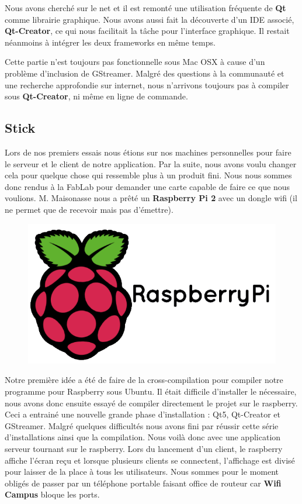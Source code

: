 \documentclass[a4paper, 11pt]{article}
\begin{document}
Nous avons cherché sur le net et il est remonté une utilisation fréquente de \textbf{Qt} comme librairie graphique. Nous avons aussi fait la découverte d'un IDE associé, \textbf{Qt-Creator}, ce qui nous facilitait la tâche pour l'interface graphique. Il restait néanmoins à intégrer les deux frameworks en même temps.

Cette partie n'est toujours pas fonctionnelle sous Mac OSX à cause d'un problème d'inclusion de GStreamer. Malgré des questions à la communauté et une recherche approfondie sur internet, nous n'arrivons toujours pas à compiler sous \textbf{Qt-Creator}, ni même en ligne de commande.

\subsection{Stick}

Lors de nos premiers essais nous étions sur nos machines personnelles pour faire le serveur et le client de notre application. Par la suite, nous avons voulu changer cela pour quelque chose qui ressemble plus à un produit fini. Nous nous sommes donc rendus à la FabLab pour demander une carte capable de faire ce que nous voulions. M. Maisonasse nous a prêté un \textbf{Raspberry Pi 2} avec un dongle wifi (il ne permet que de recevoir mais pas d'émettre).

\begin{figure}[!h]
	\centering
	\includegraphics[width=1\textwidth]{raspberry_pi_logo.png}
\end{figure}

Notre première idée a été de faire de la cross-compilation pour compiler notre programme pour Raspberry sous Ubuntu. Il était difficile d'installer le nécessaire, nous avons donc ensuite essayé de compiler directement le projet sur le raspberry. Ceci a entrainé une nouvelle grande phase d'installation : Qt5, Qt-Creator et GStreamer. Malgré quelques difficultés nous avons fini par réussir cette série d'installations ainsi que la compilation. Nous voilà donc avec une application serveur tournant sur le raspberry. Lors du lancement d'un client, le raspberry affiche l'écran reçu et lorsque plusieurs clients se connectent, l'affichage est divisé pour laisser de la place à tous les utilisateurs. Nous sommes pour le moment obligés de passer par un téléphone portable faisant office de routeur car \textbf{Wifi Campus} bloque les ports.
\end{document}
